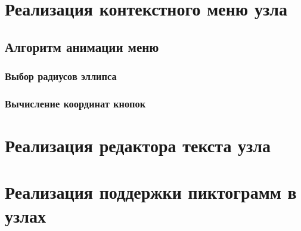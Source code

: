 \section{Реализация контекстного меню узла}\label{sec:context_menu}

\subsection*{Алгоритм анимации меню}

\subsubsection*{Выбор радиусов эллипса}

\subsubsection*{Вычисление координат кнопок}

\section{Реализация редактора текста узла}\label{sec:node_text_editor}

\section{Реализация поддержки пиктограмм в узлах}\label{sec:node_icons_support}

